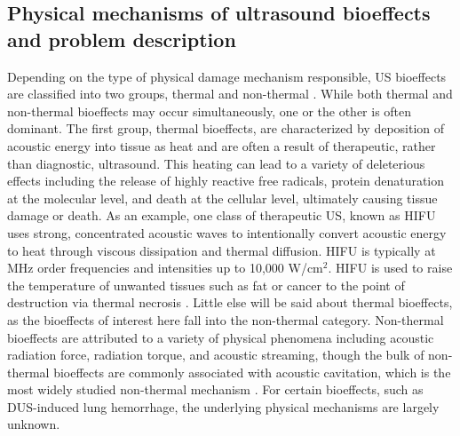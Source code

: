 \subsection{Physical mechanisms of ultrasound bioeffects and problem
  description} \label{sec:bioeffects_mechanisms}%
Depending on the type of physical damage mechanism responsible,
\ac{US} bioeffects are classified into two groups, thermal and
non-thermal \citep{Dalecki2004}. While both thermal and non-thermal
bioeffects may occur simultaneously, one or the other is often
dominant. The first group, thermal bioeffects, are characterized by
deposition of acoustic energy into tissue as heat and are often a
result of therapeutic, rather than diagnostic, ultrasound. This
heating can lead to a variety of deleterious effects including the
release of highly reactive free radicals, protein denaturation at the
molecular level, and death at the cellular level, ultimately causing
tissue damage or death. As an example, one class of therapeutic
\ac{US}, known as \ac{HIFU} uses strong, concentrated acoustic waves
to intentionally convert acoustic energy to heat through viscous
dissipation and thermal diffusion. \ac{HIFU} is typically at MHz order
frequencies and intensities up to 10,000 W/cm$^2$. \ac{HIFU} is used
to raise the temperature of unwanted tissues such as fat or cancer to
the point of destruction via thermal necrosis
\citep{Escoffre2016}. Little else will be said about thermal
bioeffects, as the bioeffects of interest here fall into the
non-thermal category. Non-thermal bioeffects are attributed to a
variety of physical phenomena including acoustic radiation force,
radiation torque, and acoustic streaming, though the bulk of
non-thermal bioeffects are commonly associated with acoustic
cavitation, which is the most widely studied non-thermal mechanism
\citep{Dalecki2004}. For certain bioeffects, such as \ac{DUS}-induced
lung hemorrhage, the underlying physical mechanisms are largely
unknown.

